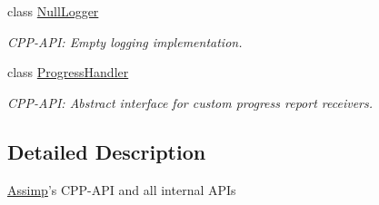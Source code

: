 \begin{DoxyCompactItemize}
class \hyperlink{class_assimp_1_1_null_logger}{Null\-Logger}
\begin{DoxyCompactList}\small\item\em C\-P\-P-\/\-A\-P\-I\-: Empty logging implementation. \end{DoxyCompactList}\item 
class \hyperlink{class_assimp_1_1_progress_handler}{Progress\-Handler}
\begin{DoxyCompactList}\small\item\em C\-P\-P-\/\-A\-P\-I\-: Abstract interface for custom progress report receivers. \end{DoxyCompactList}\end{DoxyCompactItemize}


\subsection{Detailed Description}
\hyperlink{namespace_assimp}{Assimp}'s C\-P\-P-\/\-A\-P\-I and all internal A\-P\-Is 